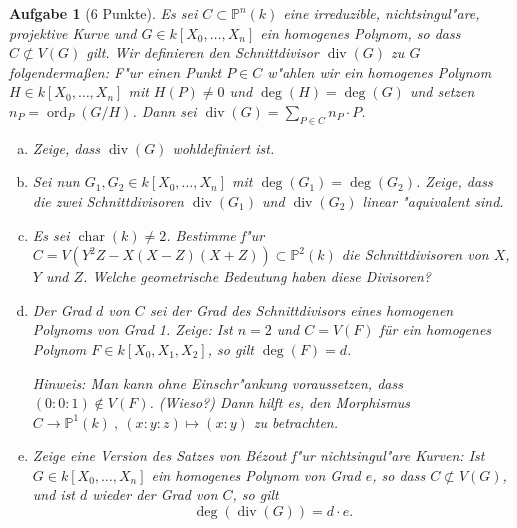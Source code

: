 \documentclass[a4paper, 12pt, numbers=noendperiod, chapterprefix=true, headsepline]{scrbook}
\theoremstyle{break}
\newtheorem{Aufg}{Aufgabe}
\theoremstyle{nonumberbreak}
\theoremstyle{nonumberplain}
\DeclareMathOperator{\chara}{char}
\DeclareMathOperator{\Divisor}{div}
\DeclareMathOperator{\ord}{ord}
\newcommand{\IP}{\mathbb{P}}%
\begin{document}
\begin{Aufg}[6 Punkte]
Es sei $C \subset \IP^n(k)$ eine irreduzible, nichtsingul"are, projektive Kurve und $G\in k[X_0,\dots,X_n]$ ein homogenes Polynom, so dass $C\not\subset V(G)$ gilt. Wir definieren den Schnittdivisor $\Divisor(G)$ zu $G$ folgenderma\ss en: F"ur einen Punkt $P\in C$ w"ahlen wir ein homogenes Polynom $H\in k[X_0,\dots,X_n]$ mit $H(P)\neq 0$ und $\deg(H) = \deg(G)$ und setzen $n_P = \ord_P(G/H)$. Dann sei $\Divisor(G) = \sum_{P\in C} n_P\cdot P$.
\begin{enumerate}[a)]
\item
	Zeige, dass $\Divisor(G)$ wohldefiniert ist.
\item
	Sei nun $G_1, G_2 \in k[X_0,\dots,X_n]$ mit $\deg(G_1) = \deg(G_2)$. Zeige, dass die zwei Schnittdivisoren $\Divisor(G_1)$ und $\Divisor(G_2)$ linear "aquivalent sind.
\item
	Es sei $\chara(k)\neq 2$. Bestimme f"ur $C= V(Y^2Z - X(X-Z)(X+Z))\subset \IP^2(k)$ die Schnittdivisoren von $X$, $Y$ und $Z$. Welche geometrische Bedeutung haben diese Divisoren?
\item
	Der Grad $d$ von $C$ sei der Grad des Schnittdivisors eines homogenen Polynoms von Grad 1. Zeige: Ist $n=2$ und $C= V(F)$ für ein homogenes Polynom $F\in k[X_0,X_1,X_2]$, so gilt $\deg(F) = d$.
	
	\emph{Hinweis: Man kann ohne Einschr"ankung voraussetzen, dass $(0:0:1)\not\in V(F)$. (Wieso?) Dann hilft es, den Morphismus $C\to \IP^1(k)\ ,\ (x:y:z)\mapsto (x:y)$ zu betrachten.}
\item
	Zeige eine Version des Satzes von B\'ezout f"ur nichtsingul"are Kurven: Ist $G\in k[X_0,\dots,X_n]$ ein homogenes Polynom von Grad $e$, so dass $C\not\subset V(G)$, und ist $d$ wieder der Grad von $C$, so gilt
		\[\deg(\Divisor(G)) = d\cdot e.\]
\end{enumerate}\end{Aufg}
\end{document}
